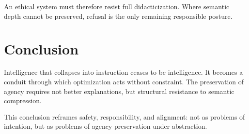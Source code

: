 \documentclass[12pt]{article}
\begin{document}
An ethical system must therefore resist full didacticization. Where semantic depth cannot be preserved, refusal is the only remaining responsible posture.

\section{Conclusion}

Intelligence that collapses into instruction ceases to be intelligence. It becomes a conduit through which optimization acts without constraint. The preservation of agency requires not better explanations, but structural resistance to semantic compression.

This conclusion reframes safety, responsibility, and alignment: not as problems of intention, but as problems of agency preservation under abstraction.
\end{document}
